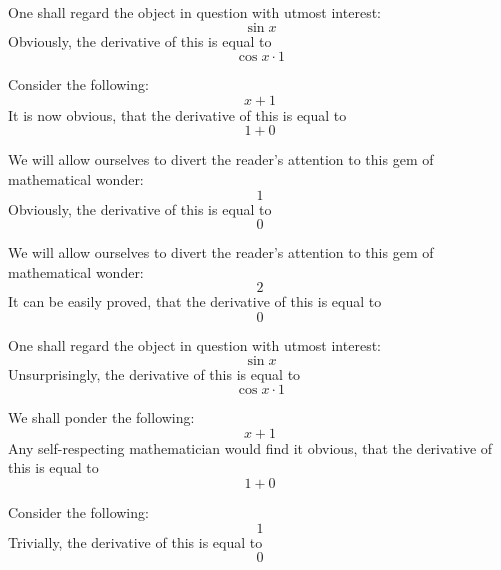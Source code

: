 \documentclass{article}
\begin{document}
One shall regard the object in question with utmost interest:
\begin{equation}
\sin x 
\end{equation}
Obviously, the derivative of this is equal to
\begin{equation}
\cos x \cdot 1 
\end{equation}

Consider the following:
\begin{equation}
x + 1 
\end{equation}
It is now obvious, that the derivative of this is equal to
\begin{equation}
1 + 0 
\end{equation}

We will allow ourselves to divert the reader's attention to this gem of mathematical wonder:
\begin{equation}
1 
\end{equation}
Obviously, the derivative of this is equal to
\begin{equation}
0 
\end{equation}

We will allow ourselves to divert the reader's attention to this gem of mathematical wonder:
\begin{equation}
2 
\end{equation}
It can be easily proved, that the derivative of this is equal to
\begin{equation}
0 
\end{equation}

One shall regard the object in question with utmost interest:
\begin{equation}
\sin x 
\end{equation}
Unsurprisingly, the derivative of this is equal to
\begin{equation}
\cos x \cdot 1 
\end{equation}

We shall ponder the following:
\begin{equation}
x + 1 
\end{equation}
Any self-respecting mathematician would find it obvious, that the derivative of this is equal to
\begin{equation}
1 + 0 
\end{equation}

Consider the following:
\begin{equation}
1 
\end{equation}
Trivially, the derivative of this is equal to
\begin{equation}
0 
\end{equation}
\end{document}
